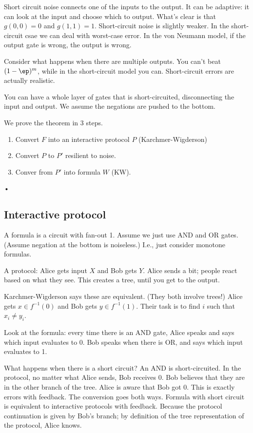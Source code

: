Short circuit noise connects one of the inputs to the output. It can be adaptive: it can look at the input and choose which to output. What's clear is that $g(0,0)=0$ and $g(1,1)=1$. Short-circuit noise is slightly weaker. In the short-circuit csae we can deal with worst-case error. In the von Neumann model, if the output gate is wrong, the output is wrong.

Consider what happens when there are multiple outputs. You can't beat $(1-\ep)^m$, while in the short-circuit model you can. Short-circuit errors are actually realistic.

You can have a whole layer of gates that is short-circuited, disconnecting the input and output.
We assume the negations are pushed to the bottom.

We prove the theorem in 3 steps.
\begin{enumerate}
\item
Convert $F$ into an interactive protocol $P$ (Karchmer-Wigderson)
\item
Convert $P$ to $P'$ resilient to noise.
\item
Conver from $P'$ into formula $W$ (KW).
\end{enumerate}•
\subsection{Interactive protocol}

A formula is a circuit with fan-out 1. Assume we just use AND and OR gates. (Assume negation at the bottom is noiseless.) I.e., just consider monotone formulas.

A protocol: Alice gets input $X$ and Bob gets $Y$. Alice sends a bit; people react based on what they see. This creates a tree, until you get to the output.

Karchmer-Wigderson says these are equivalent. (They both involve trees!) 
Alice gets $x\in f^{-1}(0)$ and Bob gets $y\in f^{-1}(1)$. Their task is to find $i$ such that $x_i\ne y_i$.

Look at the formula: every time there is an AND gate, Alice speaks and says which input evaluates to 0. Bob speaks when there is OR, and says which input evaluates to 1.

What happens when there is a short circuit? An AND is short-circuited. In the protocol, no matter what Alice sends, Bob receives 0. Bob believes that they are in the other branch of the tree. Alice is aware that Bob got 0.
This is exactly errors with feedback.
The conversion goes both ways.
Formula with short circuit is equivalent to interactive protocols with feedback. 
Because the protocol continuation is given by Bob's branch; by definition of the tree representation of the protocol, Alice knows.

